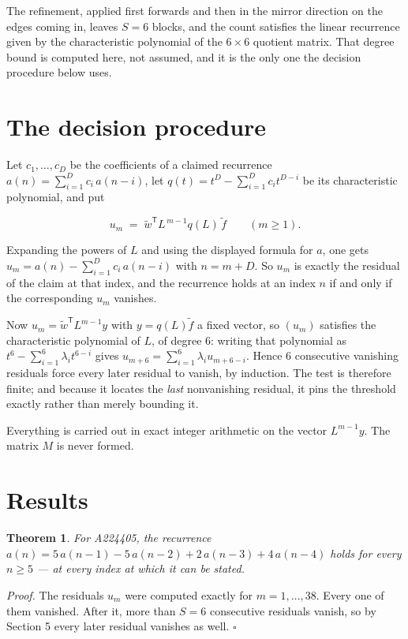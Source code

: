 \documentclass[11pt]{article}
\newtheorem{theorem}{Theorem}
\theoremstyle{definition}
\begin{document}
The refinement, applied first forwards and then in the mirror direction on the edges coming in, leaves $S = 6$ blocks, and the count satisfies the linear recurrence given by the characteristic polynomial of the $6 \times 6$ quotient matrix. That degree bound is computed here, not assumed, and it is the only one the decision procedure below uses.

\section{The decision procedure}

Let $c_1,\dots,c_D$ be the coefficients of a claimed recurrence $a(n) = \sum_{i=1}^{D} c_i\,a(n-i)$, let $q(t) = t^{D} - \sum_{i=1}^{D} c_i t^{D-i}$ be its characteristic polynomial, and put

\[u_m \;=\; \tilde w^{\mathsf T} L^{\,m-1} q(L)\,\tilde f \qquad (m \ge 1).\]

Expanding the powers of $L$ and using the displayed formula for $a$, one gets $u_m = a(n) - \sum_{i=1}^{D} c_i\,a(n-i)$ with $n = m + D$. So $u_m$ is exactly the residual of the claim at that index, and the recurrence holds at an index $n$ if and only if the corresponding $u_m$ vanishes.

Now $u_m = \tilde w^{\mathsf T} L^{m-1} y$ with $y = q(L)\tilde f$ a fixed vector, so $(u_m)$ satisfies the characteristic polynomial of $L$, of degree $6$: writing that polynomial as $t^{6} - \sum_{i=1}^{6} \lambda_i t^{6-i}$ gives $u_{m+6} = \sum_{i=1}^{6} \lambda_i u_{m+6-i}$. Hence $6$ consecutive vanishing residuals force every later residual to vanish, by induction. The test is therefore finite; and because it locates the {\itshape last} nonvanishing residual, it pins the threshold exactly rather than merely bounding it.

Everything is carried out in exact integer arithmetic on the vector $L^{m-1}y$. The matrix $M$ is never formed.

\section{Results}

\begin{theorem} For A224405, the recurrence $a(n) = 5\,a(n-1) - 5\,a(n-2) + 2\,a(n-3) + 4\,a(n-4)$ holds for every $n \ge 5$ --- at every index at which it can be stated.\end{theorem}

{\itshape Proof.} The residuals $u_m$ were computed exactly for $m = 1,\dots,38$. Every one of them vanished. After it, more than $S = 6$ consecutive residuals vanish, so by Section 5 every later residual vanishes as well. $\square$
\end{document}
